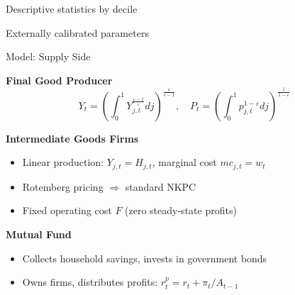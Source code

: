 \documentclass[10pt, aspectratio = 169]{beamer} %
\theoremstyle{mystyle}
\begin{document}
\begin{frame}{Descriptive statistics by decile}\label{descr}
\centering
\resizebox{\textwidth}{!}{}

\hyperlink{hetintro}{}
\end{frame}


\begin{frame}{Externally calibrated parameters
}\label{table1}
\centering
\resizebox{0.7\textwidth}{!}{}

\hyperlink{calibration}{}
\end{frame}

\begin{frame}{Model: Supply Side}\label{firmdetails}

\textbf{Final Good Producer}
\[
Y_t = \left( \int_0^1 Y_{j,t}^{\frac{\varepsilon-1}{\varepsilon}} dj \right)^{\frac{\varepsilon}{\varepsilon-1}}, \quad P_t = \left( \int_0^1 p_{j,t}^{1-\varepsilon} dj \right)^{\frac{1}{1-\varepsilon}}
\]

\textbf{Intermediate Goods Firms}
\begin{itemize}
    \item Linear production: $Y_{j,t} = H_{j,t}$, marginal cost $mc_{j,t} = w_t$
    \item Rotemberg pricing $\Rightarrow$ standard NKPC
    \item Fixed operating cost $F$ (zero steady-state profits)
\end{itemize}

\textbf{Mutual Fund}
\begin{itemize}
    \item Collects household savings, invests in government bonds
    \item Owns firms, distributes profits: $r^p_t = r_t + \pi_t / A_{t-1}$
\end{itemize}
\hyperlink{modelsetup}{}

\end{frame}
\end{document}
